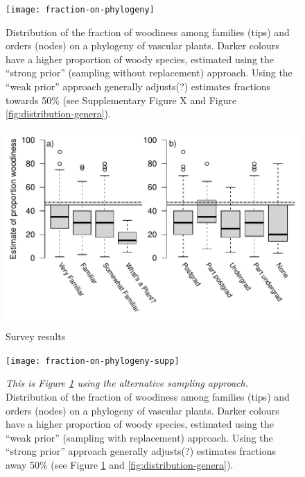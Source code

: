 \documentclass[12pt]{article}
\begin{document}
\begin{figure}[p]
  \centering
  \texttt{[image: fraction-on-phylogeny]}
  \caption{Distribution of the fraction of woodiness among families
    (tips) and orders (nodes) on a phylogeny of vascular plants.
    Darker colours have a higher proportion of woody species,
    estimated using the ``strong prior'' (sampling without
    replacement) approach.  Using the ``weak prior'' approach
    generally adjusts(?) estimates fractions towards 50\% (see
    Supplementary Figure X and Figure \ref{fig:distribution-genera}).
  }
\label{fig:phylogeny}
\end{figure}

\begin{figure}[p]
  \centering
  \includegraphics{survey-results}
  \caption{Survey results}
  \label{fig:survey}
\end{figure}

\begin{figure}[p]
  \centering
  \texttt{[image: fraction-on-phylogeny-supp]}

  \caption{
    \textit{This is Figure \ref{fig:phylogeny} using the alternative
      sampling approach.}\\
    Distribution of the fraction of woodiness among families
    (tips) and orders (nodes) on a phylogeny of vascular plants.
    Darker colours have a higher proportion of woody species,
    estimated using the ``weak prior'' (sampling with
    replacement) approach.  Using the ``strong prior'' approach
    generally adjusts(?) estimates fractions away 50\% (see Figure
    \ref{fig:phylogeny} and \ref{fig:distribution-genera}).
    }
\label{fig:phylogeny-supp}
\end{figure}
\end{document}

